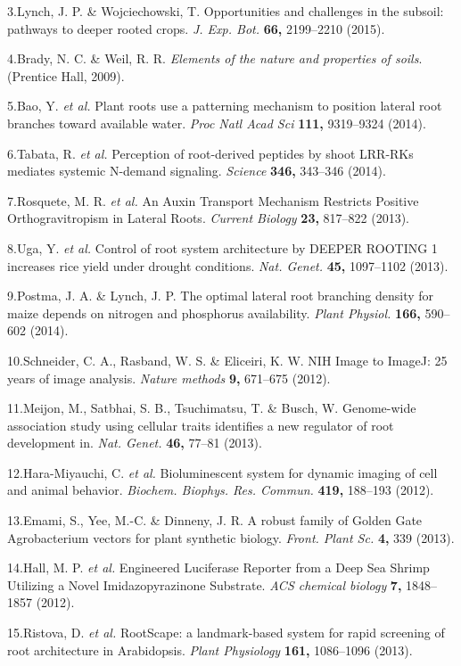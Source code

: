 \documentclass[]{article}
\begin{document}
3.Lynch, J. P. \& Wojciechowski, T. Opportunities and challenges in the
subsoil: pathways to deeper rooted crops. \emph{J. Exp. Bot.}
\textbf{66,} 2199--2210 (2015).

4.Brady, N. C. \& Weil, R. R. \emph{Elements of the nature and
properties of soils}. (Prentice Hall, 2009).

5.Bao, Y. \emph{et al.} Plant roots use a patterning mechanism to
position lateral root branches toward available water. \emph{Proc Natl
Acad Sci} \textbf{111,} 9319--9324 (2014).

6.Tabata, R. \emph{et al.} Perception of root-derived peptides by shoot
LRR-RKs mediates systemic N-demand signaling. \emph{Science}
\textbf{346,} 343--346 (2014).

7.Rosquete, M. R. \emph{et al.} An Auxin Transport Mechanism Restricts
Positive Orthogravitropism in Lateral Roots. \emph{Current Biology}
\textbf{23,} 817--822 (2013).

8.Uga, Y. \emph{et al.} Control of root system architecture by DEEPER
ROOTING 1 increases rice yield under drought conditions. \emph{Nat.
Genet.} \textbf{45,} 1097--1102 (2013).

9.Postma, J. A. \& Lynch, J. P. The optimal lateral root branching
density for maize depends on nitrogen and phosphorus availability.
\emph{Plant Physiol.} \textbf{166,} 590--602 (2014).

10.Schneider, C. A., Rasband, W. S. \& Eliceiri, K. W. NIH Image to
ImageJ: 25 years of image analysis. \emph{Nature methods} \textbf{9,}
671--675 (2012).

11.Meijon, M., Satbhai, S. B., Tsuchimatsu, T. \& Busch, W. Genome-wide
association study using cellular traits identifies a new regulator of
root development in. \emph{Nat. Genet.} \textbf{46,} 77--81 (2013).

12.Hara-Miyauchi, C. \emph{et al.} Bioluminescent system for dynamic
imaging of cell and animal behavior. \emph{Biochem. Biophys. Res.
Commun.} \textbf{419,} 188--193 (2012).

13.Emami, S., Yee, M.-C. \& Dinneny, J. R. A robust family of Golden
Gate Agrobacterium vectors for plant synthetic biology. \emph{Front.
Plant Sc.} \textbf{4,} 339 (2013).

14.Hall, M. P. \emph{et al.} Engineered Luciferase Reporter from a Deep
Sea Shrimp Utilizing a Novel Imidazopyrazinone Substrate. \emph{ACS
chemical biology} \textbf{7,} 1848--1857 (2012).

15.Ristova, D. \emph{et al.} RootScape: a landmark-based system for
rapid screening of root architecture in Arabidopsis. \emph{Plant
Physiology} \textbf{161,} 1086--1096 (2013).
\end{document}
